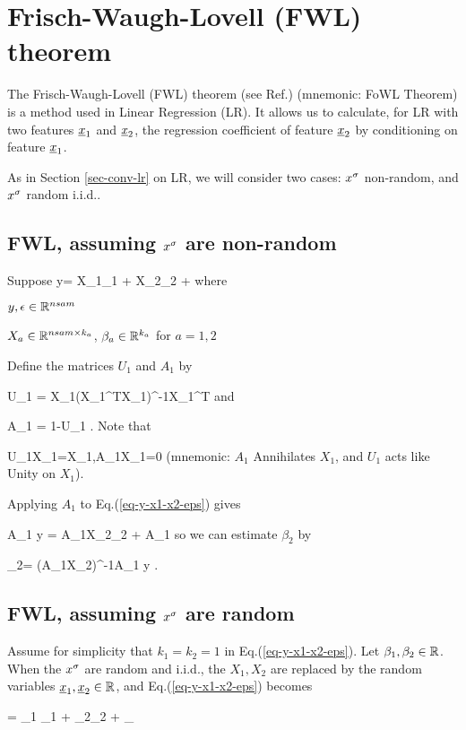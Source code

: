 \chapter{Frisch-Waugh-Lovell (FWL) theorem}
\label{ch-fwl-theo}

The Frisch-Waugh-Lovell (FWL) theorem
(see Ref.\cite{wiki-fwl-theo})
(mnemonic: FoWL Theorem)
is a method used in Linear Regression (LR).
It allows us to
calculate,
for LR with
two features ${\underline{x}}_1$ and ${\underline{x}}_2$,
the regression coefficient 
of feature ${\underline{x}}_2$
by conditioning
on feature ${\underline{x}}_1$.

As in Section \ref{sec-conv-lr}
on LR, we will consider
two cases: $x^\sigma$ non-random, and $x^\sigma$ random i.i.d..

\section{FWL, assuming $x^\sigma$ are non-random}
Suppose
\beq
y=  X_1\beta_1 + X_2\beta_2 + \eps
\label{eq-y-x1-x2-eps}
\eeq
where

$y, \epsilon\in { \mathbb{R}}^{nsam}$

$X_a\in { \mathbb{R}}^{nsam\times k_a}$,
$\beta_a\in { \mathbb{R}}^{k_a}$ for $a=1,2$

Define the matrices $U_1$ and $A_1$ by

\beq
U_1 = X_1(X_1^TX_1)^{-1}X_1^T
\eeq
and

\beq
A_1 = 1-U_1
\;.
\eeq
Note that

\beq
U_1X_1=X_1\;,\;\;A_1X_1=0
\eeq
(mnemonic: $A_1$ Annihilates $X_1$,
and $U_1$ acts like Unity on $X_1$).

Applying $A_1$ to Eq.(\ref{eq-y-x1-x2-eps}) gives

\beq
A_1 y = A_1X_2\beta_2  + A_1\eps
\eeq
so we can estimate $\beta_2$ by

\beq
\HAT{\beta}_2=
(A_1X_2)^{-1}A_1 y
\label{eq-fwl-nonrand}
\;.
\eeq

\section{FWL, assuming $x^\sigma$ are random}

Assume for simplicity that 
$k_1=k_2=1$
in Eq.(\ref{eq-y-x1-x2-eps}). Let
$\beta_1,\beta_2\in{ \mathbb{R}}$.
When the $x^\sigma$ are random and i.i.d.,
the
$X_1, X_2$ are
replaced by 
the random variables
${\underline{x}}_1, {\underline{x}}_2\in { \mathbb{R}}$,
and
Eq.(\ref{eq-y-x1-x2-eps})
becomes

\beq
\rvy = \beta_1 \rvx_1 + 
\beta_2\rvx_2 + \rveps_\rvy
\label{eq-y-x1-x2-rand}
\eeq

